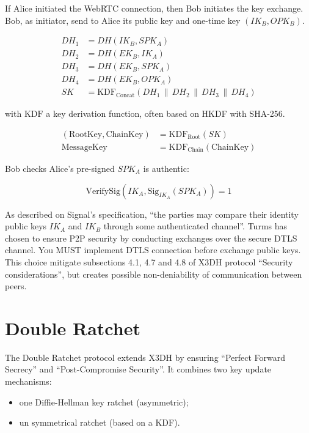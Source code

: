 If Alice initiated the WebRTC connection, then Bob initiates the key exchange. 
Bob, as initiator, send to Alice its public key and one-time key \((IK_B, 
OPK_B)\).

\begin{align*}
    DH_1 &= DH(IK_B, SPK_A)\\
    DH_2 &= DH(EK_B, IK_A)\\
    DH_3 &= DH(EK_B, SPK_A)\\
    DH_4 &= DH(EK_B, OPK_A)\\
    SK &= \mathrm{KDF}_{\text{Concat}}\left( DH_1 \,\|\, DH_2 \,\|\, DH_3 
\,\|\, DH_4 \right)
\end{align*}

with \(\mathrm{KDF}\) a key derivation function, often based on HKDF with 
SHA-256.

\begin{align*}
    (\text{RootKey}, \text{ChainKey}) &= \mathrm{KDF}_{\text{Root}}(SK)\\
    \text{MessageKey} &= \mathrm{KDF}_{\text{Chain}}(\text{ChainKey})
\end{align*}

Bob checks Alice's pre-signed \(SPK_A\) is authentic:

\begin{equation*}
    \mathrm{VerifySig}(IK_A, \mathrm{Sig}_{IK_A}(SPK_A)) = 1
\end{equation*}

As described on Signal's specification, \enquote{the parties may compare their 
identity public keys \(IK_A\) and \(IK_B\) through some authenticated 
channel}\cite[p. 7]{marlinspike2016}. Turms has chosen to ensure P2P security 
by conducting exchanges over the secure DTLS channel. You MUST implement DTLS 
connection before exchange public keys. This choice mitigate subsections 4.1, 
4.7 and 4.8 of X3DH protocol \enquote{Security 
considerations}\cite{marlinspike2016}, but creates possible non-deniability of 
communication between peers.

\section{Double Ratchet}

The Double Ratchet protocol extends X3DH by ensuring \enquote{Perfect Forward 
Secrecy} and \enquote{Post-Compromise Security}\cite{perrin2025}. It combines
two key update mechanisms:
\begin{itemize}
    \item one Diffie-Hellman key ratchet (asymmetric);
    \item un symmetrical ratchet (based on a KDF).
\end{itemize}

